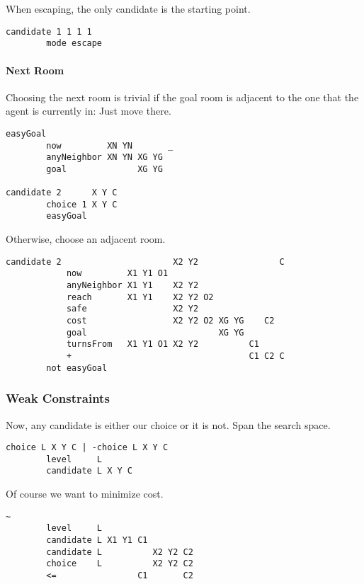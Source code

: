 When escaping, the only candidate is the starting point.

\begin{verbatim}
candidate 1 1 1 1
        mode escape
\end{verbatim}

\hypertarget{next-room}{%
\paragraph{Next Room}\label{next-room}}

Choosing the next room is trivial if the goal room is adjacent to the
one that the agent is currently in: Just move there.

\begin{verbatim}
easyGoal
        now         XN YN       _
        anyNeighbor XN YN XG YG
        goal              XG YG

candidate 2      X Y C
        choice 1 X Y C
        easyGoal
\end{verbatim}

Otherwise, choose an adjacent room.

\begin{verbatim}
candidate 2                      X2 Y2                C
            now         X1 Y1 O1
            anyNeighbor X1 Y1    X2 Y2
            reach       X1 Y1    X2 Y2 O2
            safe                 X2 Y2
            cost                 X2 Y2 O2 XG YG    C2
            goal                          XG YG
            turnsFrom   X1 Y1 O1 X2 Y2          C1
            +                                   C1 C2 C
        not easyGoal
\end{verbatim}

\hypertarget{weak-constraints}{%
\subsubsection{Weak Constraints}\label{weak-constraints}}

Now, any candidate is either our choice or it is not. Span the search
space.

\begin{verbatim}
choice L X Y C | -choice L X Y C
        level     L
        candidate L X Y C
\end{verbatim}

Of course we want to minimize cost.

\begin{verbatim}
~
        level     L
        candidate L X1 Y1 C1
        candidate L          X2 Y2 C2
        choice    L          X2 Y2 C2
        <=                C1       C2
\end{verbatim}

